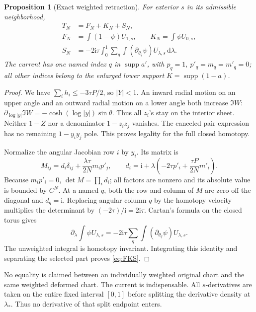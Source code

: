 \documentclass[11pt]{article}
\numberwithin{equation}{section}
\newtheorem{proposition}[theorem]{Proposition}
\theoremstyle{definition}
\newcommand{\dd}{\,\mathrm d}
\newcommand{\ii}{\mathrm i}
\begin{document}
\begin{proposition}[Exact weighted retraction]\label{prop:selector}
For exterior \(s\) in its admissible neighborhood,
\begin{align}
 T_N&=F_N+K_N+S_N,\label{eq:FKS}\\
 F_N&=\int(1-\psi)U_{1,s},\qquad K_N=\int\psi U_{0,s},\nonumber\\
 S_N&=-2\ii\tau\int_0^1\sum_q\int
                         (\partial_{\theta_q}\psi)U_{\lambda,s}\dd\lambda.
 \label{eq:current}
\end{align}
The current has one named index \(q\) in \(\operatorname{supp}a'\),
with \(p_q=1,\ p'_q=m_q=m'_q=0\); all other indices belong to
the enlarged lower support \(K=\operatorname{supp}(1-a)\).
\end{proposition}
\begin{proof}
We have \(\sum_i h_i\le-3\tau P/2\), so \(|Y|<1\).
An inward radial motion on an upper angle and an outward radial motion
on a lower angle both increase \(\Im W\):
\(\partial_{\log|y|}\Im W=-\cosh(\log|y|)\sin\theta\).
Thus all \(z_i\)'s stay on the interior sheet. Neither \(1-Z\)
nor a denominator \(1-z_iz_j\) vanishes. The canceled pair expression
has no remaining \(1-y_iy_j\) pole. This proves legality for the full
closed homotopy.

Normalize the angular Jacobian row \(i\) by \(y_i\). Its matrix is
\[
 M_{ij}=d_i\delta_{ij}+\frac{\lambda\tau}{2N}m_i p'_j,\qquad
 d_i=\ii+\lambda\left(-2\tau p'_i+\frac{\tau P}{2N}m'_i\right).
\]
Because \(m_ip'_i=0\), \(\det M=\prod_i d_i\); all factors are
nonzero and its absolute value is bounded by \(C^N\).
At a named \(q\), both the row and column of \(M\) are zero
off the diagonal and \(d_q=\ii\). Replacing angular column \(q\)
by the homotopy velocity multiplies the determinant by
\((-2\tau)/\ii=2\ii\tau\).
Cartan's formula on the closed torus gives
\[
 \partial_\lambda\int\psi U_{\lambda,s}
 =-2\ii\tau\sum_q\int(\partial_{\theta_q}\psi)U_{\lambda,s}.
\]
The unweighted integral is homotopy invariant. Integrating this identity
and separating the selected part proves \eqref{eq:FKS}.
\end{proof}

No equality is claimed between an individually weighted original chart
and the same weighted deformed chart. The current is indispensable.
All \(s\)-derivatives are taken on the entire fixed interval
\([0,1]\) before splitting the derivative density at \(\lambda_*\).
Thus no derivative of that split endpoint enters.
\end{document}
